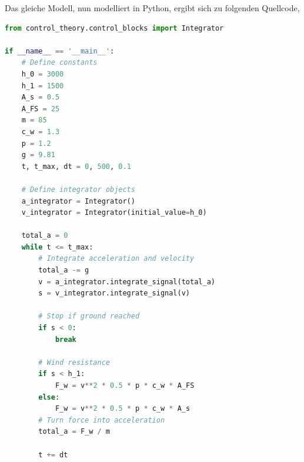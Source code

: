 \documentclass[]{iat}
\begin{document}
Das gleiche Modell, nun modelliert in Python, ergibt sich zu folgenden Quellcode,

\begin{lstlisting}[language=Python]
from control_theory.control_blocks import Integrator

if __name__ == '__main__':
    # Define constants
    h_0 = 3000
    h_1 = 1500
    A_s = 0.5
    A_FS = 25
    m = 85
    c_w = 1.3
    p = 1.2
    g = 9.81
    t, t_max, dt = 0, 500, 0.1

    # Define integrator objects
    a_integrator = Integrator()
    v_integrator = Integrator(initial_value=h_0)

    total_a = 0
    while t <= t_max:
        # Integrate acceleration and velocity
        total_a -= g
        v = a_integrator.integrate_signal(total_a)
        s = v_integrator.integrate_signal(v)

        # Stop if ground reached
        if s < 0:
            break

        # Wind resistance
        if s < h_1:
            F_w = v**2 * 0.5 * p * c_w * A_FS
        else:
            F_w = v**2 * 0.5 * p * c_w * A_s
        # Turn force into acceleration
        total_a = F_w / m

        t += dt

\end{lstlisting}
\end{document}

